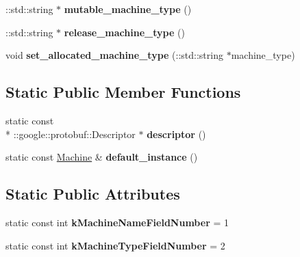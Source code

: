 \begin{DoxyCompactItemize}
\item 
\hypertarget{classmachines_1_1Machine_a049efda8b0c783a249431bd7df5f4495}{\-::std\-::string $\ast$ {\bfseries mutable\-\_\-machine\-\_\-type} ()}\label{classmachines_1_1Machine_a049efda8b0c783a249431bd7df5f4495}

\item 
\hypertarget{classmachines_1_1Machine_a92f937436c942cc79a1f4a3580bbafce}{\-::std\-::string $\ast$ {\bfseries release\-\_\-machine\-\_\-type} ()}\label{classmachines_1_1Machine_a92f937436c942cc79a1f4a3580bbafce}

\item 
\hypertarget{classmachines_1_1Machine_a3ea6d390f0d5875828acd8979681d7fc}{void {\bfseries set\-\_\-allocated\-\_\-machine\-\_\-type} (\-::std\-::string $\ast$machine\-\_\-type)}\label{classmachines_1_1Machine_a3ea6d390f0d5875828acd8979681d7fc}

\end{DoxyCompactItemize}
\subsection*{Static Public Member Functions}
\begin{DoxyCompactItemize}
\item 
\hypertarget{classmachines_1_1Machine_afd031b5e971083f0e7c0aaaa3558d36f}{static const \\*
\-::google\-::protobuf\-::\-Descriptor $\ast$ {\bfseries descriptor} ()}\label{classmachines_1_1Machine_afd031b5e971083f0e7c0aaaa3558d36f}

\item 
\hypertarget{classmachines_1_1Machine_ac32386f09022b17269958601d93f58b5}{static const \hyperlink{classmachines_1_1Machine}{Machine} \& {\bfseries default\-\_\-instance} ()}\label{classmachines_1_1Machine_ac32386f09022b17269958601d93f58b5}

\end{DoxyCompactItemize}
\subsection*{Static Public Attributes}
\begin{DoxyCompactItemize}
\item 
\hypertarget{classmachines_1_1Machine_aa64db7733cf367861716bffacad30247}{static const int {\bfseries k\-Machine\-Name\-Field\-Number} = 1}\label{classmachines_1_1Machine_aa64db7733cf367861716bffacad30247}

\item 
\hypertarget{classmachines_1_1Machine_a5b2fee2d6cfcbf08bdda83eef925748f}{static const int {\bfseries k\-Machine\-Type\-Field\-Number} = 2}\label{classmachines_1_1Machine_a5b2fee2d6cfcbf08bdda83eef925748f}

\end{DoxyCompactItemize}
